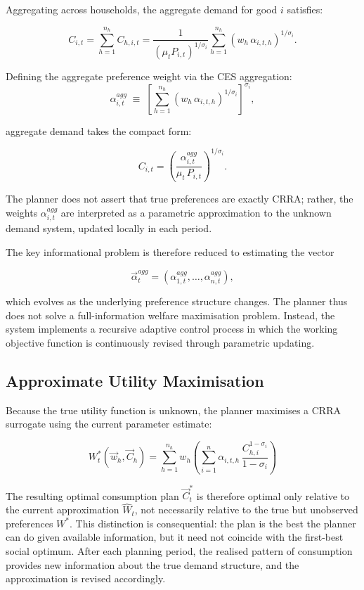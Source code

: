 Aggregating across households, the aggregate demand for good $i$
satisfies:

\[
C_{i,t} = \sum_{h=1}^{n_h} C_{h,i,t}
         = \frac{1}{(\mu_t P_{i,t})^{1/\sigma_i}}
           \sum_{h=1}^{n_h} (w_h\,\alpha_{i,t,h})^{1/\sigma_i}.
\]

Defining the aggregate preference weight via the CES aggregation:
\[
\alpha^{agg}_{i,t} \;\equiv\; \left[\sum_{h=1}^{n_h}
  (w_h\,\alpha_{i,t,h})^{1/\sigma_i}\right]^{\!\sigma_i},
\]

aggregate demand takes the compact form:

\begin{equation}\label{eq:crra_demand}
C_{i,t} = \left(\frac{\alpha^{agg}_{i,t}}{\mu_t\, P_{i,t}}\right)^{1/\sigma_i}.
\end{equation}

The planner does not assert that true preferences are exactly CRRA;
rather, the weights $\alpha^{agg}_{i,t}$ are interpreted as a
parametric approximation to the unknown demand system, updated locally
in each period.

The key informational problem is therefore reduced to estimating the
vector

\[
\vec{\alpha}^{agg}_t = (\alpha^{agg}_{1,t},\dots,\alpha^{agg}_{n,t}),
\]

which evolves as the underlying preference structure changes. The
planner thus does not solve a full-information welfare maximisation
problem. Instead, the system implements a recursive adaptive control
process in which the working objective function is continuously
revised through parametric updating.

\subsection{Approximate Utility Maximisation}

Because the true utility function is unknown, the planner maximises a
CRRA surrogate using the current parameter estimate:

\[
{W}^{*}_t( \vec{w}_{h},\vec{C}_{h})
= \sum_{h = 1}^{n_{h}} w_{h}
  \left(\sum_{i=1}^n \alpha_{i,t,h}
        \,\frac{C_{h,i}^{1-\sigma_i}}{1-\sigma_i}\right)
\]

The resulting optimal consumption plan $\vec{C}^*_t$ is therefore
optimal only relative to the current approximation $\hat{W}_t$, not
necessarily relative to the true but unobserved preferences $W^*$.
This distinction is consequential: the plan is the best the planner
can do given available information, but it need not coincide with the
first-best social optimum. After each planning period, the realised
pattern of consumption provides new information about the true demand
structure, and the approximation is revised accordingly.

